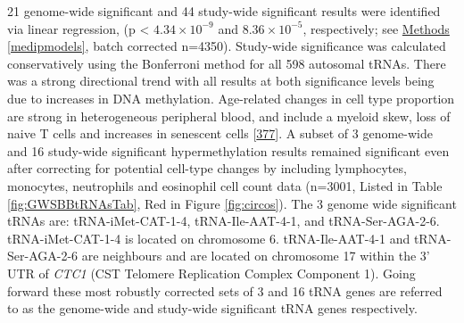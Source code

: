\documentclass[
]{book}
\begin{document}
21 genome-wide significant and 44 study-wide significant results were identified via linear regression, (p \textless{} \(4.34\times10^{-9}\) and \(8.36\times10^{-5}\), respectively; see \protect\hyperlink{medipmodels}{Methods} \ref{medipmodels}, batch corrected n=4350).
Study-wide significance was calculated conservatively using the Bonferroni method for all 598 autosomal tRNAs.
There was a strong directional trend with all results at both significance levels being due to increases in DNA methylation.
Age-related changes in cell type proportion are strong in heterogeneous peripheral blood, and include a myeloid skew, loss of naive T cells and increases in senescent cells {[}\protect\hyperlink{ref-Geiger2013}{377}{]}.
A subset of 3 genome-wide and 16 study-wide significant hypermethylation results remained significant even after correcting for potential cell-type changes by including lymphocytes, monocytes, neutrophils and eosinophil cell count data (n=3001, Listed in Table \ref{fig:GWSBBtRNAsTab}, Red in Figure \ref{fig:circos}).
The 3 genome wide significant tRNAs are: tRNA-iMet-CAT-1-4, tRNA-Ile-AAT-4-1, and tRNA-Ser-AGA-2-6.
tRNA-iMet-CAT-1-4 is located on chromosome 6.
tRNA-Ile-AAT-4-1 and tRNA-Ser-AGA-2-6 are neighbours and are located on chromosome 17 within the 3' UTR of \emph{CTC1} (CST Telomere Replication Complex Component 1).
Going forward these most robustly corrected sets of 3 and 16 tRNA genes are referred to as the genome-wide and study-wide significant tRNA genes respectively.
\end{document}
